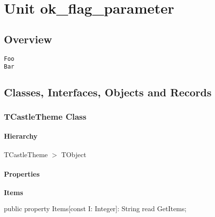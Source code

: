 \documentclass{report}
\newif\ifpdf
\begin{document}
\label{toc}\tableofcontents
\newpage
\newlength{\tmplength}
\chapter{Unit ok{\_}flag{\_}parameter}
\label{ok_flag_parameter}
\section{Overview}
\begin{description}
\item[\texttt{\begin{ttfamily}TCastleTheme\end{ttfamily} Class}]
\end{description}
\begin{description}
\item[\texttt{Foo}]
\item[\texttt{Bar}]
\end{description}
\section{Classes, Interfaces, Objects and Records}
\ifpdf
\subsection*{\large{\textbf{TCastleTheme Class}}\normalsize\hspace{1ex}\hrulefill}
\else
\subsection*{TCastleTheme Class}
\fi
\label{ok_flag_parameter.TCastleTheme}
\subsubsection*{\large{\textbf{Hierarchy}}\normalsize\hspace{1ex}\hfill}
TCastleTheme {$>$} TObject
\subsubsection*{\large{\textbf{Properties}}\normalsize\hspace{1ex}\hfill}
\begin{list}{}{
\setlength{\itemindent}{0cm}
\setlength{\listparindent}{0cm}
\setlength{\leftmargin}{\evensidemargin}
\addtolength{\leftmargin}{\tmplength}
\settowidth{\labelsep}{X}
\addtolength{\leftmargin}{\labelsep}
\setlength{\labelwidth}{\tmplength}
}
\label{ok_flag_parameter.TCastleTheme-Items}
\item[\textbf{Items}\hfill]
\ifpdf
\begin{flushleft}
\fi
\begin{ttfamily}
public property Items[const I: Integer]: String read GetItems;\end{ttfamily}

\ifpdf
\end{flushleft}
\fi


\par  \end{list}
\end{document}
